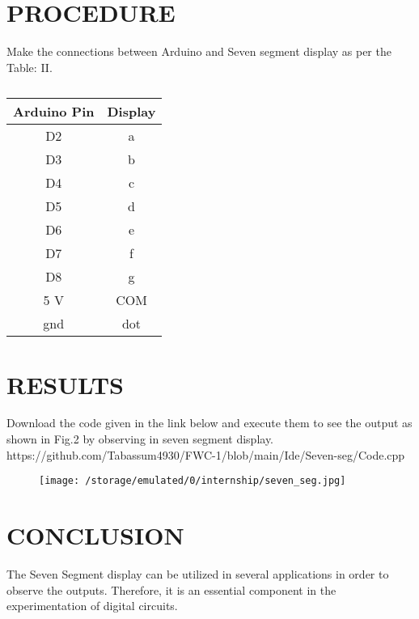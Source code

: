 \documentclass[conference]{IEEEtran}
\begin{document}
\section{PROCEDURE}
Make the connections between Arduino and Seven segment display as per the Table: II.
 \begin{table}[htbp]                                       
\centering                                                          
\begin{tabular}{| c | c |} \hline                                
	\textbf{Arduino Pin} & \textbf{Display}  \\\hline 
D2 & a  \\ \hline                          
D3 &  b \\ \hline                          
D4 & c \\ \hline     
D5 & d \\ \hline
D6 & e \\ \hline
D7 & f \\ \hline
D8 & g \\ \hline
5 V  & COM \\ \hline                         
gnd  & dot \\ \hline                                                               
\end{tabular}                                                        
\vspace{0.1cm}                                                       
\caption{\label{tab:widgets}}                                       
\end{table}
\section{RESULTS}
Download the code given in the link below and execute them to see the output as shown in Fig.2 by observing in seven segment display. 
 \\ https://github.com/Tabassum4930/FWC-1/blob/main/Ide/Seven-seg/Code.cpp
\begin{figure}[h] 
	\centering 
	\texttt{[image: /storage/emulated/0/internship/seven\_seg.jpg]}
	\caption{\label{fig:Gates}}    
\end{figure}
\section{CONCLUSION}
The Seven Segment display can be utilized in several applications in order to observe the outputs. Therefore, it is an essential component in the experimentation of digital circuits.
\end{document}
